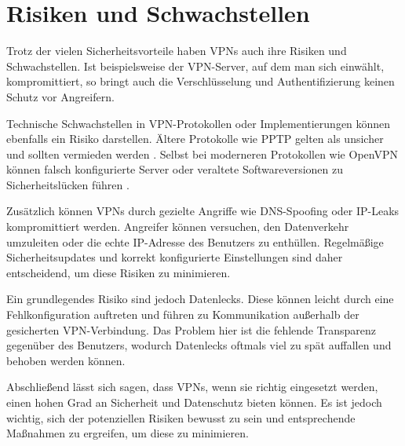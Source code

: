 \section{Risiken und Schwachstellen}

Trotz der vielen Sicherheitsvorteile haben \gls{VPN}s auch ihre Risiken und Schwachstellen. Ist beispielsweise der \gls{VPN}-Server, auf dem man sich einwählt, kompromittiert, so bringt auch die Verschlüsselung und Authentifizierung keinen Schutz vor Angreifern. 

Technische Schwachstellen in \gls{VPN}-Protokollen oder Implementierungen können ebenfalls ein Risiko darstellen. Ältere Protokolle wie \gls{PPTP} gelten als unsicher und sollten vermieden werden \cite{BSI_VPN_10}. Selbst bei moderneren Protokollen wie Open\gls{VPN} können falsch konfigurierte Server oder veraltete Softwareversionen zu Sicherheitslücken führen \cite{OpenVPN_Security_Advisories}.

Zusätzlich können \gls{VPN}s durch gezielte Angriffe wie DNS-Spoofing oder IP-Leaks kompromittiert werden. Angreifer können versuchen, den Datenverkehr umzuleiten oder die echte IP-Adresse des Benutzers zu enthüllen. Regelmäßige Sicherheitsupdates und korrekt konfigurierte Einstellungen sind daher entscheidend, um diese Risiken zu minimieren. \cite{Lyu2022}

Ein grundlegendes Risiko sind jedoch Datenlecks. Diese können leicht durch eine Fehlkonfiguration auftreten und führen zu Kommunikation außerhalb der gesicherten \gls{VPN}-Verbindung. Das Problem hier ist die fehlende Transparenz gegenüber des Benutzers, wodurch Datenlecks oftmals viel zu spät auffallen und behoben werden können.

Abschließend lässt sich sagen, dass \gls{VPN}s, wenn sie richtig eingesetzt werden, einen hohen Grad an Sicherheit und Datenschutz bieten können. Es ist jedoch wichtig, sich der potenziellen Risiken bewusst zu sein und entsprechende Maßnahmen zu ergreifen, um diese zu minimieren.

